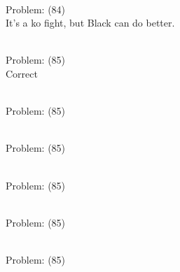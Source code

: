 \documentclass[11pt]{article}
\begin{document}
\begin{minipage}[t]{0.5\textwidth}
  {\centering
  
\\
Problem: (84)\\
It's a ko fight, but Black can do better.\\
  }
\end{minipage}
\begin{minipage}[t]{0.5\textwidth}
  {\centering
  
\\
Problem: (85)\\
Correct\\
  }
\end{minipage}
\begin{minipage}[t]{0.5\textwidth}
  {\centering
  
\\
Problem: (85)\\
  }
\end{minipage}
\begin{minipage}[t]{0.5\textwidth}
  {\centering
  
\\
Problem: (85)\\
  }
\end{minipage}
\begin{minipage}[t]{0.5\textwidth}
  {\centering
  
\\
Problem: (85)\\
  }
\end{minipage}
\begin{minipage}[t]{0.5\textwidth}
  {\centering
  
\\
Problem: (85)\\
  }
\end{minipage}
\begin{minipage}[t]{0.5\textwidth}
  {\centering
  
\\
Problem: (85)\\
  }
\end{minipage}
\end{document}
